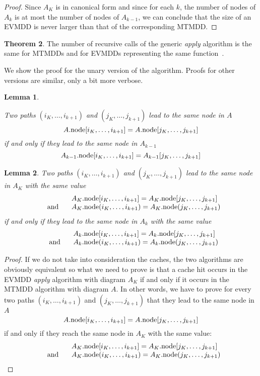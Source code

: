 \documentclass[a4paper]{easychair}
\newcommand{\m}{\mbox}
\newcommand{\node}[1]{#1{\rm .node}}
\newtheorem{lemma}{Lemma}
\begin{document}
{\begin{appendix}
\begin{proof}
Since $A_K$ is in canonical form and since for each $k$, the number of nodes of 
$A_k$ is at most the number of nodes of $A_{k-1}$, 
we can conclude that the size of an EVMDD is never larger than that of the corresponding MTMDD.
\end{proof}

\noindent\textbf{Theorem 2}.
The number of recursive calls of the generic \emph{apply} algorithm is 
the same for MTMDDs and for EVMDDs representing the same function~\cite{Lai1996}.

  We show the proof for the unary version of the algorithm.
  Proofs for other versions are similar, only a bit more verbose.

\begin{lemma}\label{lemma-n-k-1}

Two paths $(i_K, \ldots, i_{k+1})$ and $(j_K, \ldots, j_{k+1})$ lead to 
the same node in $A$
$$
\node{A}[i_K, \ldots, i_{k+1}] = \node{A}[j_K, \ldots, j_{k+1}]
$$
if and only if they lead to the same node in $A_{k-1}$
$$
\node{A_{k-1}}[i_K, \ldots, i_{k+1}] = A_{k-1}[j_K, \ldots, j_{k+1}]
$$
\end{lemma}

\begin{lemma}\label{lemma-n-k}
  Two paths $(i_K, \ldots, i_{k+1})$ and $(j_K, \ldots, j_{k+1})$ lead to the same node in $A_K$ with the same value
$$
\begin{array}{ll}
&\node{A_K}[i_K, \ldots, i_{k+1}] = \node{A_K}[j_K, \ldots, j_{k+1}]\\
\;\;\;\m{and}\;\;\;&
\node{A_K}(i_K, \ldots, i_{k+1}) = \node{A_K}(j_K, \ldots, j_{k+1})
\end{array}
$$
if and only if they lead to the same node in $A_k$ with the same value
$$
\begin{array}{ll}
&\node{A_k}[i_K, \ldots, i_{k+1}] = \node{A_k}[j_K, \ldots, j_{k+1}]\\
\;\;\;\m{and}\;\;\;&
\node{A_k}(i_K, \ldots, i_{k+1}) = \node{A_k}(j_K, \ldots, j_{k+1})
\end{array}
$$
\end{lemma}


\begin{proof}

If we do not take into consideration the caches, the two algorithms are 
obviously equivalent so what we need to prove is that a cache hit occurs 
in the EVMDD \emph{apply} algorithm with diagram $A_K$ if and only if it 
occurs in the MTMDD algorithm with diagram $A$. In other words, we have 
to prove for every two paths $(i_K, \ldots, i_{k+1})$ and $(j_K, \ldots, 
j_{k+1})$ that they lead to the same node in $A$ $$ \node{A}[i_K, 
\ldots, i_{k+1}] = \node{A}[j_K, \ldots, j_{k+1}] $$ if and only if they 
reach the same node in $A_K$ with the same value: $$ \begin{array}{ll} 
&\node{A_K}[i_K, \ldots, i_{k+1}] = \node{A_K}[j_K, \ldots, j_{k+1}]\\ 
\;\;\;\m{and}\;\;\;& \node{A_K}(i_K, \ldots, i_{k+1}) = \node{A_K}(j_K, 
\ldots, j_{k+1}) \end{array} $$


\end{proof}
\end{appendix}}
\end{document}
